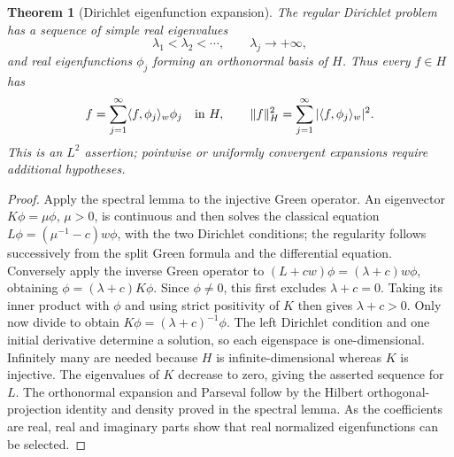 \documentclass[11pt,oneside]{book}
\newtheorem{theorem}{Theorem}[chapter]
\theoremstyle{definition}
\theoremstyle{remark}\newtheorem{remark}[theorem]{Remark}
\begin{document}
\begin{theorem}[Dirichlet eigenfunction expansion]\label{d13:10:spectrum}
The regular Dirichlet problem has a sequence of simple real eigenvalues
\[
 \lambda_1<\lambda_2<\cdots,\qquad \lambda_j\longrightarrow+\infty,
\]
and real eigenfunctions \(\phi_j\) forming an orthonormal basis of \(H\).
Thus every \(f\in H\) has
\[
 f=\sum_{j=1}^{\infty}\langle f,\phi_j\rangle_w\phi_j
 \quad\hbox{in }H,\qquad
 \lVert f\rVert_H^2=\sum_{j=1}^{\infty}|\langle f,\phi_j\rangle_w|^2 .
\]
This is an \(L^2\) assertion; pointwise or uniformly convergent expansions
require additional hypotheses.
\end{theorem}
\begin{proof}
Apply the spectral lemma to the injective Green operator. An eigenvector
\(K\phi=\mu\phi\), \(\mu>0\), is continuous and then solves the classical
equation \(L\phi=(\mu^{-1}-c)w\phi\), with the two Dirichlet conditions;
the regularity follows successively from the split Green formula and
the differential equation. Conversely apply the inverse Green operator
to \((L+cw)\phi=(\lambda+c)w\phi\), obtaining
\(\phi=(\lambda+c)K\phi\). Since \(\phi\ne0\), this first excludes
\(\lambda+c=0\). Taking its inner product with \(\phi\) and using strict
positivity of \(K\) then gives \(\lambda+c>0\). Only now divide to obtain
\(K\phi=(\lambda+c)^{-1}\phi\).
The left Dirichlet condition and one initial derivative determine a
solution, so each eigenspace is one-dimensional. Infinitely many are
needed because \(H\) is infinite-dimensional whereas \(K\) is injective.
The eigenvalues of \(K\) decrease to zero, giving the asserted sequence
for \(L\). The orthonormal expansion and Parseval follow by the Hilbert
orthogonal-projection identity and density proved in the spectral lemma.
As the coefficients are real, real and imaginary parts show that real
normalized eigenfunctions can be selected.
\end{proof}
\end{document}
